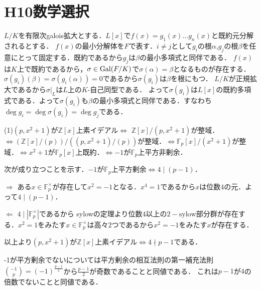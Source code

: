 \documentclass[
		book,
		head_space=20mm,
		foot_space=20mm,
		gutter=10mm,
		line_length=190mm
]{jlreq}
\begin{document}
\section{H10数学選択}
$L/K$を有限次galois拡大とする．$L[x]$で$f(x)=g_1(x)\dots g_n(x)$と既約元分解されるとする．
$f(x)$の最小分解体を$F$で表す．$i\neq j$として$g_i$の根$\alpha$,$g_j$の根$\beta$を任意にとって固定する．既約であるから$g_j$は$\beta$の最小多項式と同伴である．
$f(x)$は$K$上で既約であるから，$\sigma \in \mathop{\mathrm{Gal}}(F/K)$で$\sigma(\alpha)=\beta$となるものが存在する．
$\sigma(g_i)(\beta)=\sigma(g_i(\alpha))=0$であるから$\sigma(g_i)$は$\beta$を根にもつ．
$L/K$が正規拡大であるから$\sigma|_L$は$L$上の$K$-自己同型である．
よって$\sigma(g_i)$は$L[x]$の既約多項式である．よって$\sigma(g_i)$も$\beta$の最小多項式と同伴である．すなわち$\deg g_i =\deg \sigma(g_i)=\deg g_j$である．

(1)$(p,x^2+1)$が$\mathbb{Z}[x]$上素イデアル$\Leftrightarrow$ $\mathbb{Z}[x]/(p,x^2+1)$が整域．$\Leftrightarrow( \mathbb{Z}[x]/(p)) /((p,x^2+1)/(p))$が整域．$\Leftrightarrow \mathbb{F}_p[x]/(x^2+1)$が整域．$\Leftrightarrow x^2+1$が$\mathbb{F}_p[x]$上既約．$\Leftrightarrow -1$が$\mathbb{F}_p$上平方非剰余．

次が成り立つことを示す．$-1$が$\mathbb{F}_p$上平方剰余$\Leftrightarrow 4\mathrel{\mid} (p-1)$．

$\Rightarrow$ ある$x \in \mathbb{F}_p^\times$が存在して$x^2=-1$となる．$x^4=1$であるから$x$は位数$4$の元．よって$4\mathrel{\mid} (p-1)$．

$\Leftarrow$ $4\mathrel{\mid} |\mathbb{F}_p^\times|$であるから sylowの定理より位数$4$以上の$2-  \mathrm{sylow}$部分群が存在する．$x^2=1$をみたす$x\in  \mathbb{F}_p^\times$は高々$2$つであるから$x^2=-1$をみたす$x$が存在する．

以上より$(p,x^2+1)$が$\mathbb{Z}[x]$上素イデアル$\Leftrightarrow 4\mathrel{\nmid} p-1$である．

\begin{tcolorbox}[blanker,breakable,
	left=3mm,right=3mm,
	top=3mm,bottom=3mm,
	before skip=15pt,after skip=15pt,
	borderline vertical={1pt}{0pt}{black,dotted}]
	-1が平方剰余でないについては平方剰余の相互法則の第一補充法則$\binom{-1}{p}=(-1)^{\frac{p-1}{2}}$から$\frac{p-1}{2}$が奇数であることと同値である．
    これは$p-1$が$4$の倍数でないことと同値である．
	\end{tcolorbox}
\end{document}
